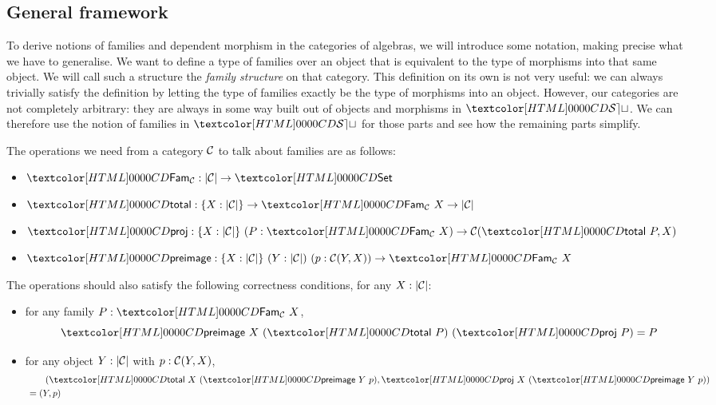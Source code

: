 \subsection{General framework}
\label{general-framework}

To derive notions of families and dependent morphism in the categories
of algebras, we will introduce some notation, making precise what we
have to generalise. We want to define a type of families over an
object that is equivalent to the type of morphisms into that same
object. We will call such a structure the \emph{family structure} on
that category. This definition on its own is not very useful: we can
always trivially satisfy the definition by letting the type of
families exactly be the type of morphisms into an object. However, our
categories are not completely arbitrary: they are always in some way
built out of objects and morphisms in $\SET$. We can therefore use the
notion of families in $\SET$ for those parts and see how the remaining
parts simplify.

\begin{definition}
  The operations we need from a category $\mathcal{C}$ to talk about families
  are as follows:
%
  \begin{itemize}
  \item $\Fam_{\Cc} : | \Cc | \to \Set$
  \item $\total : \{ X : | \Cc | \} \to \Fam_{\Cc}\ X \to | \Cc |$
  \item
    $\proj : \{ X : | \Cc | \}\ (P : \Fam_{\Cc}\ X) \to \Cc(\total\ P,
    X)$
  \item
    $\preimage : \{ X : | \Cc | \}\ (Y : | \Cc |)\ (p : \Cc(Y,X)) \to
    \Fam_{\Cc}\ X$
  \end{itemize}
%
  The operations should also satisfy the following correctness
  conditions, for any $X : | \mathcal{C} |$:
%
  \begin{itemize}
  \item for any family $P : \Fam_{\Cc}\ X$,
  $$\preimage\ X\ (\total\ P)\ (\proj\ P) = P$$
\item for any object $Y : | \mathcal{C} |$ with $p : \mathcal{C}(Y,X)$,
  \begin{align*}
    &\ \ \ \ \ \ (\total\ X\ (\preimage\ Y\ p) , \proj\ X\ (\preimage\ Y\ p)) \\
    &= (Y,p)
  \end{align*}
\end{itemize}
%
\end{definition}

